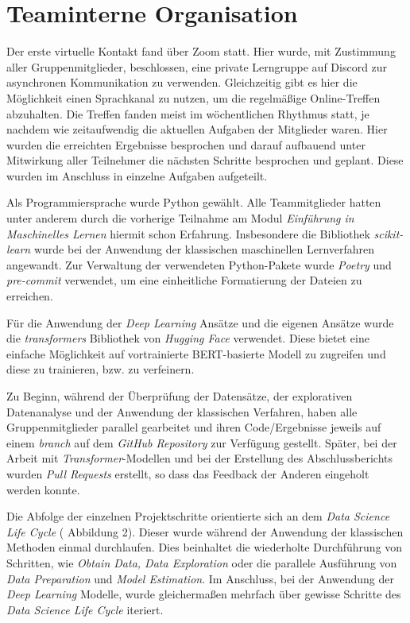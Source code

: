 \section{Teaminterne Organisation}

Der erste virtuelle Kontakt fand über Zoom statt. Hier wurde, mit Zustimmung aller Gruppenmitglieder, beschlossen, eine private Lerngruppe auf Discord zur asynchronen Kommunikation zu verwenden. Gleichzeitig gibt es hier die Möglichkeit einen Sprachkanal zu nutzen, um die regelmäßige Online-Treffen abzuhalten. Die Treffen fanden meist im wöchentlichen Rhythmus statt, je nachdem wie zeitaufwendig die aktuellen Aufgaben der Mitglieder waren. Hier wurden die erreichten Ergebnisse besprochen und darauf aufbauend unter Mitwirkung aller Teilnehmer die nächsten Schritte besprochen und geplant. Diese wurden im Anschluss in einzelne Aufgaben aufgeteilt.

Als Programmiersprache wurde Python gewählt. Alle Teammitglieder hatten unter anderem durch die vorherige Teilnahme am Modul \textit{Einführung in Maschinelles Lernen} hiermit schon Erfahrung. Insbesondere die Bibliothek \textit{scikit-learn} wurde bei der Anwendung der klassischen maschinellen Lernverfahren angewandt.
Zur Verwaltung der verwendeten Python-Pakete wurde \textit{Poetry} und \textit{pre-commit} verwendet, um eine einheitliche Formatierung der Dateien zu erreichen.

Für die Anwendung der \textit{Deep Learning} Ansätze und die eigenen Ansätze wurde die \textit{transformers} Bibliothek von \textit{Hugging Face} verwendet. Diese bietet eine einfache Möglichkeit auf vortrainierte BERT-basierte Modell zu zugreifen und diese zu trainieren, bzw. zu verfeinern.

Zu Beginn, während der Überprüfung der Datensätze, der explorativen Datenanalyse und der Anwendung der klassischen Verfahren, haben alle Gruppenmitglieder parallel gearbeitet und ihren Code/Ergebnisse jeweils auf einem \textit{branch} auf dem \textit{GitHub Repository} zur Verfügung gestellt. Später, bei der Arbeit mit \textit{Transformer}-Modellen und bei der Erstellung des Abschlussberichts wurden \textit{Pull Requests} erstellt, so dass das Feedback der Anderen eingeholt werden konnte. 

Die Abfolge der einzelnen Projektschritte orientierte sich an dem \textit{Data Science Life Cycle} (\cite{Stodden2020} Abbildung 2). Dieser wurde während der Anwendung der klassischen Methoden einmal durchlaufen. Dies beinhaltet die wiederholte Durchführung von Schritten, wie \textit{Obtain Data, Data Exploration} oder die parallele Ausführung von \textit{Data Preparation} und \textit{Model Estimation}.  Im Anschluss, bei der Anwendung der \textit{Deep Learning} Modelle, wurde gleichermaßen mehrfach über gewisse Schritte des \textit{Data Science Life Cycle} iteriert.
